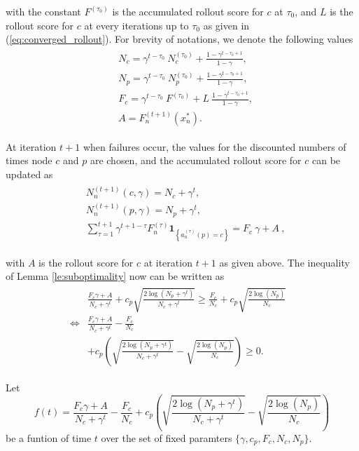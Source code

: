 with the constant $F^{(\tau_0)}$ is the accumulated rollout score for $c$ at $\tau_0$, and $L$ is the rollout score for $c$ at every iterations up to $\tau_0$ as given in (\ref{eq:converged_rollout}). For brevity of notations, we denote the following values
\begin{eqnarray} \label{eq:NPCF}
    \begin{aligned}
        &N_c = \gamma^{t-\tau_0}\ N^{(\tau_0)}_c + \frac{1-\gamma^{t-\tau_0+1}}{1-\gamma}, \\
        &N_p = \gamma^{t-\tau_0}\ N^{(\tau_0)}_p + \frac{1-\gamma^{t-\tau_0+1}}{1-\gamma}, \\
        &F_c = \gamma^{t-\tau_0}\ F^{(\tau_0)}  + L\ \frac{1-\gamma^{t-\tau_0+1}}{1-\gamma}, \\
        & A  = F_n^{(t+1)} (x^*_n).
    \end{aligned}
\end{eqnarray}

At iteration $t+1$ when failures occur, the values for the discounted numbers of times node $c$ and $p$ are chosen, and the accumulated rollout score for $c$ can be updated as
\begin{eqnarray} \label{t+1}
\begin{aligned}
    &N^{(t+1)}_n(c,\gamma) = N_c + \gamma^t, \\
    &N^{(t+1)}_n(p,\gamma) = N_p + \gamma^t, \\ 
    &\sum_{\tau=1}^{t+1} \gamma^{t+1-\tau} F^{(\tau)}_n \textbf{1}_{ \left\{ a_n^{(\tau)}(p)=c \right\}} = F_c\ \gamma + A\ ,
\end{aligned}
\end{eqnarray}

\noindent with $A$ is the rollout score for $c$ at iteration $t+1$ as given above. The inequality of Lemma \ref{le:suboptimality} now can be written as
\begin{eqnarray} \label{f_t}
\begin{aligned}
 &\frac{F_c\gamma + A}{N_c + \gamma^t} + c_p \sqrt{\frac{2\log(N_p + \gamma^t)}{N_c + \gamma^t}} \geq \frac{F_c}{N_c} + c_p \sqrt{\frac{2\log(N_p)}{N_c}} \\
 \Leftrightarrow &\frac{F_c\gamma + A}{N_c + \gamma^t} - \frac{F_c}{N_c}&  \\
 &+ c_p\left(\sqrt{\frac{2\log(N_p + \gamma^t)}{N_c + \gamma^t}} - \sqrt{\frac{2\log(N_p)}{N_c}}\right) \geq 0.
\end{aligned}
\end{eqnarray}

Let 
\begin{equation}
f(t) = \frac{F_c\gamma + A}{N_c + \gamma^t} - \frac{F_c}{N_c} + c_p\left(\sqrt{\frac{2\log(N_p + \gamma^t)}{N_c + \gamma^t}} - \sqrt{\frac{2\log(N_p)}{N_c}}\right)    
\end{equation}
be a funtion of time $t$ over the set of fixed paramters $\{\gamma, c_p, F_c, N_c, N_p\}$.

